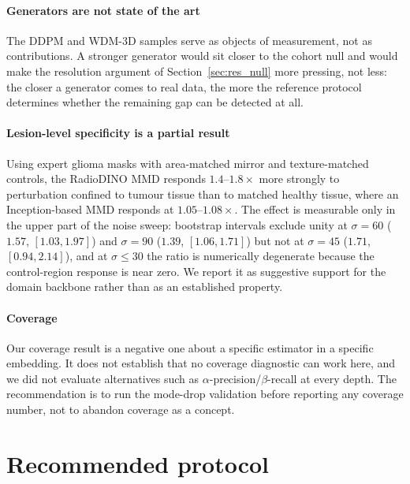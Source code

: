\documentclass[preprint,12pt,authoryear]{elsarticle}
\begin{document}
\paragraph{Generators are not state of the art}
The DDPM and WDM-3D samples serve as objects of measurement, not as
contributions. A stronger generator would sit closer to the cohort null and
would make the resolution argument of Section~\ref{sec:res_null} more pressing,
not less: the closer a generator comes to real data, the more the reference
protocol determines whether the remaining gap can be detected at all.

\paragraph{Lesion-level specificity is a partial result}
Using expert glioma masks with area-matched mirror and texture-matched
controls, the RadioDINO MMD responds $1.4$--$1.8\times$ more strongly to
perturbation confined to tumour tissue than to matched healthy tissue, where an
Inception-based MMD responds at $1.05$--$1.08\times$. The effect is measurable
only in the upper part of the noise sweep: bootstrap intervals exclude unity at
$\sigma = 60$ ($1.57$, $[1.03, 1.97]$) and $\sigma = 90$ ($1.39$,
$[1.06, 1.71]$) but not at $\sigma = 45$ ($1.71$, $[0.94, 2.14]$), and at
$\sigma \le 30$ the ratio is numerically degenerate because the control-region
response is near zero. We report it as suggestive support for the domain
backbone rather than as an established property.

\paragraph{Coverage}
Our coverage result is a negative one about a specific estimator in a specific
embedding. It does not establish that no coverage diagnostic can work here, and
we did not evaluate alternatives such as $\alpha$-precision/$\beta$-recall
\citep{alaa2022faithful} at every depth. The recommendation is to run the
mode-drop validation before reporting any coverage number, not to abandon
coverage as a concept.

\section{Recommended protocol}
\label{sec:protocol}
\end{document}
